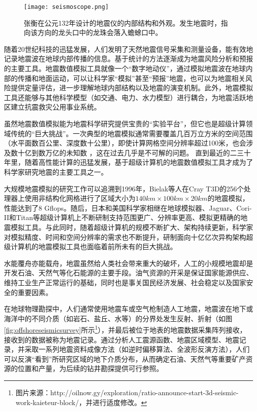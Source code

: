 \begin{figure}[ht]
\centering
\texttt{[image: seismoscope.png]}
\caption{张衡在公元132年设计的地震仪的内部结构和外观\citep{hsiao2009review}。发生地震时，指向该方向的龙头口中的龙珠会落入蟾蜍口中。}
\label{fig:heng-scope}
\end{figure}

随着20世纪科技的迅猛发展，人们发明了天然地震信号采集和测量设备，能有效地记录地震波在地球内部传播的信息。基于统计的方法逐渐成为地震风险分析和预报的主要工具。地震数值模拟工具就像一个“数字地动仪”，通过模拟地震波在地球内部的传播和地面运动，可以让科学家“模拟”甚至“预报”地震，也可以为地震相关风险提供定量评估，进一步理解地球内部结构以及地震的演变机制。此外，地震模拟工具还能够与其他科学模型（如交通、电力、水力模型）进行耦合，为地震活跃地区建立抗震救灾公用事业系统。

虽然地震数值模拟能为地震科学研究提供宝贵的“实验平台”，但它也是超级计算领域传统的“巨大挑战”。一次典型的地震模拟通常需要覆盖几百万立方米的空间范围（水平面数百公里、深度数十公里），即使计算网格空间分辨率超过100米，也会涉及数十亿到数万亿的未知数 \citep{cui2010scalable}，这在过去几乎是不可解的问题。 直到最近的二三十年里，随着高性能计算的迅猛发展，基于超级计算机的地震数值模拟工具才成为了科学家研究地震的主要工具之一。

大规模地震模拟的研究工作可以追溯到1996年，Bielak等人在Cray T3D的256个处理器上使用非结构化网格进行了区域大小为$140km \times 100km \times 20km$的地震模拟\citep{bao1996earthquake}，性能达到了8 Gflops。随后，日本和美国科学家相继在地球模拟器\cite{chen2006glueball}、Jaguar\cite{carrington2008high}、Cori-II\citep{breuer2017edge}和Titan\cite{cui2013physics}等超级计算机上不断研制支持范围更广、分辨率更高、模拟更精确的地震模拟工具。与此同时，随着超级计算机的规模不断扩大、架构持续更新，科学家对模拟精度、时间和空间分辨率的需求也不断提升，研制面向十亿亿次异构架构超级计算机的地震模拟工具也面临着前所未有的巨大挑战。


水能覆舟亦能载舟，地震虽然给人类社会带来重大的破坏，人工的小规模地震却是开发石油、天然气等化石能源的主要手段。油气资源的开采是保证国家能源供应、维持工业生产正常运行的基础，同时也是事关国民经济发展、社会稳定以及国家安全的重要因素\cite{甘霖2016面向地球科学数值模拟的可重构计算方法研究}。

在地球物理勘探中，人们通常使用地震车或空气枪制造人工地震，地震波在地下或海洋中的不同介质（如岩石、盐丘、水等）的分界处发生反射、折射（如图\ref{fig:offshoreseismicsurvey}所示\footnote{图片来源：http://oilnow.gy/exploration/ratio-announce-start-3d-seismic-work-kaieteur-block/，并进行适度修改。}），并最后被位于地表的地震数据采集阵列接收，接收到的数据被称为地震记录。通过分析人工震源函数、地震区域模型、地震记录，并采取一系列地震资料成像方法（如逆时偏移算法、全波形反演方法），人们可以反演“看到”所研究区域的地下介质分布，从而确定石油、天然气等重要矿产资源的位置和产量，为后续的钻井勘探提供可行参照。

